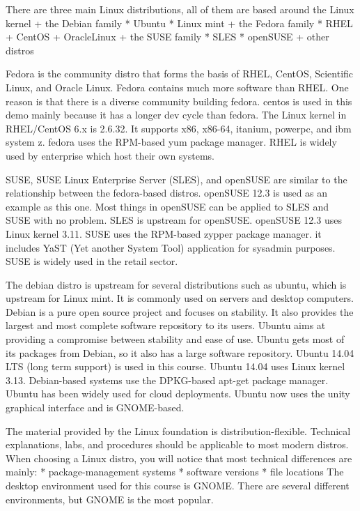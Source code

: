 There are three main Linux distributions, all of them are based around
the Linux kernel + the Debian family * Ubuntu * Linux mint + the Fedora
family * RHEL + CentOS + OracleLinux + the SUSE family * SLES * openSUSE
+ other distros

Fedora is the community distro that forms the basis of RHEL, CentOS,
Scientific Linux, and Oracle Linux. Fedora contains much more software
than RHEL. One reason is that there is a diverse community building
fedora. centos is used in this demo mainly because it has a longer dev
cycle than fedora. The Linux kernel in RHEL/CentOS 6.x is 2.6.32. It
supports x86, x86-64, itanium, powerpc, and ibm system z. fedora uses
the RPM-based yum package manager. RHEL is widely used by enterprise
which host their own systems.

SUSE, SUSE Linux Enterprise Server (SLES), and openSUSE are similar to
the relationship between the fedora-based distros. openSUSE 12.3 is used
as an example as this one. Most things in openSUSE can be applied to
SLES and SUSE with no problem. SLES is upstream for openSUSE. openSUSE
12.3 uses Linux kernel 3.11. SUSE uses the RPM-based zypper package
manager. it includes YaST (Yet another System Tool) application for
sysadmin purposes. SUSE is widely used in the retail sector.

The debian distro is upstream for several distributions such as ubuntu,
which is upstream for Linux mint. It is commonly used on servers and
desktop computers. Debian is a pure open source project and focuses on
stability. It also provides the largest and most complete software
repository to its users. Ubuntu aims at providing a compromise between
stability and ease of use. Ubuntu gets most of its packages from Debian,
so it also has a large software repository. Ubuntu 14.04 LTS (long term
support) is used in this course. Ubuntu 14.04 uses Linux kernel 3.13.
Debian-based systems use the DPKG-based apt-get package manager. Ubuntu
has been widely used for cloud deployments. Ubuntu now uses the unity
graphical interface and is GNOME-based.

The material provided by the Linux foundation is distribution-flexible.
Technical explanations, labs, and procedures should be applicable to
most modern distros. When choosing a Linux distro, you will notice that
most technical differences are mainly: * package-management systems *
software versions * file locations The desktop environment used for this
course is GNOME. There are several different environments, but GNOME is
the most popular.

